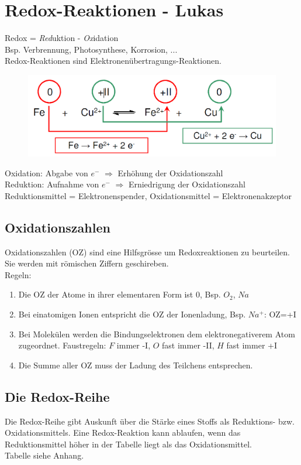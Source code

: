 \section{Redox-Reaktionen - Lukas}
Redox = \emph{Red}uktion - \emph{Ox}idation \\
Bsp. Verbrennung, Photosynthese, Korrosion, ... \\

Redox-Reaktionen sind Elektronenübertragungs-Reaktionen.
\begin{figure}[htbp]
	\centering
	\includegraphics[width=0.6\linewidth]{images/9_Redox_Reaktion.png}
\end{figure}

Oxidation: Abgabe von $e^-$ $\Rightarrow$ Erhöhung der Oxidationszahl \\
Reduktion: Aufnahme von $e^-$ $\Rightarrow$ Erniedrigung der Oxidationszahl \\

Reduktionsmittel = Elektronenspender, Oxidationsmittel = Elektronenakzeptor


\subsection{Oxidationszahlen}
Oxidationszahlen (OZ) sind eine Hilfsgrösse um Redoxreaktionen zu beurteilen. Sie werden mit römischen Ziffern geschireben. \\
Regeln:
\begin{enumerate}
	\item Die OZ der Atome in ihrer elementaren Form ist 0, Bsp. $O_2$, $Na$
	\item Bei einatomigen Ionen entspricht die OZ der Ionenladung, Bsp. $Na^+$: OZ=+I
	\item Bei Molekülen werden die Bindungselektronen dem elektronegativerem Atom zugeordnet. Faustregeln: $F$ immer -I, $O$ fast immer -II, $H$ fast immer +I
	\item Die Summe aller OZ muss der Ladung des Teilchens entsprechen.
\end{enumerate}

\subsection{Die Redox-Reihe}
Die Redox-Reihe gibt Auskunft über die Stärke eines Stoffs als Reduktions- bzw. Oxidationsmittels. Eine Redox-Reaktion kann ablaufen, wenn das Reduktionsmittel höher in der Tabelle liegt als das Oxidationsmittel.\\

Tabelle siehe Anhang. \\

